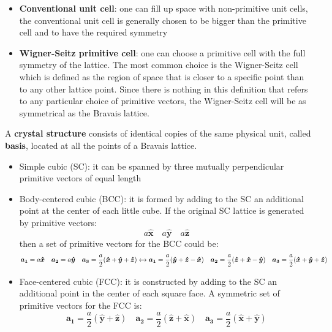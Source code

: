 \documentclass[10.75pt,a4paper,openright,bottom=2cm]{article}
\renewcommand{\Vec}[1]{\boldsymbol{#1}}
\begin{document}
\begin{itemize}
    \item \textbf{Conventional unit cell}: one can fill up space with non-primitive unit cells, the conventional unit cell is generally chosen to be bigger than the primitive cell and to have the required symmetry
    \item \textbf{Wigner-Seitz primitive cell}: one can choose a primitive cell with the full symmetry of the lattice. The most common choice is the Wigner-Seitz cell which is defined as the region of space that is closer to a specific point than to any other lattice point. Since there is nothing in this definition that refers to any particular choice of primitive vectors, the Wigner-Seitz cell will be as symmetrical as the Bravais lattice. 
\end{itemize}
A \textbf{crystal structure} consists of identical copies of the same physical unit, called \textbf{basis}, located at all the points of a Bravais lattice. 
\hline
\begin{itemize}
    \item Simple cubic (SC): it can be spanned by three mutually perpendicular primitive vectors of equal length
    \item Body-centered cubic (BCC): it is formed by adding to the SC an additional point at the center of each little cube. If the original SC lattice is generated by primitive vectors:
    \[
    a\Vec{\hat{x}} \quad a\Vec{\hat{y}} \quad a\Vec{\hat{z}}
    \]
    then a set of primitive vectors for the BCC could be:
    \[
    \Vec{a_1}=a\Vec{\hat{x}} \quad \Vec{a_2}=a\Vec{\hat{y}} \quad \Vec{a_3}=\frac{a}{2}(\Vec{\hat{x}}+\Vec{\hat{y}}+\Vec{\hat{z}})
    \xleftrightarrow[]{}
    \Vec{a_1}=\frac{a}{2}(\Vec{\hat{y}}+\Vec{\hat{z}}-\Vec{\hat{x}}) \quad \Vec{a_2}=\frac{a}{2}(\Vec{\hat{z}}+\Vec{\hat{x}}-\Vec{\hat{y}}) \quad \Vec{a_3}=\frac{a}{2}(\Vec{\hat{x}}+\Vec{\hat{y}}+\Vec{\hat{z}})
    \]
    \item Face-centered cubic (FCC): it is constructed by adding to the SC an additional point in the center of each square face. A symmetric set of primitive vectors for the FCC is:
    \[
    \Vec{a_1}=\frac{a}{2}(\Vec{\hat{y}}+\Vec{\hat{z}}) \quad \Vec{a_2}=\frac{a}{2}(\Vec{\hat{z}}+\Vec{\hat{x}}) \quad \Vec{a_3}=\frac{a}{2}(\Vec{\hat{x}}+\Vec{\hat{y}})
    \]
\end{itemize}
\end{document}
